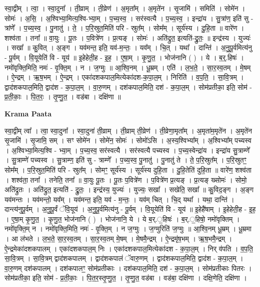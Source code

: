 \documentclass[17pt]{extarticle}
\begin{document}
स्वा॒द्वीम् । त्वा॒ । स्वा॒दुना᳚ । ती॒व्राम् । ती॒व्रेण॑ । अ॒मृता᳚म् । अ॒मृते॑न । सृ॒जामि॑ । समिति॑ । सोमे॑न । सोमः॑ । अ॒सि॒ । अ॒श्विभ्या॒मित्य॒श्वि-भ्या॒म् । प॒च्य॒स्व॒ । सर॑स्वत्यै । प॒च्य॒स्व॒ । इन्द्रा॑य । सु॒त्रांण॒ इति॑ सु - त्रांणे᳚ । प॒च्य॒स्व॒ । पु॒नातु॑ । ते॒ । प॒रि॒स्रुत॒मिति॑ परि - स्रुत᳚म् । सोम᳚म् । सूर्य॑स्य । दु॒हि॒ता ॥ वारे॑ण । शश्व॑ता । तना᳚ ॥ वा॒युः । पू॒तः । प॒वित्रे॑ण । प्र॒त्यङ् । सोमः॑ । अति॑द्रुत॒ इत्यति॑-द्रु॒तः॒ ॥ इन्द्र॑स्य । युज्यः॑ । सखा᳚ ॥ कु॒वित् । अ॒ङ्ग । यव॑मन्त॒ इति॒ यव॑-म॒न्तः॒ । यव᳚म् । चि॒त् । यथा᳚ । दान्ति॑ । अ॒नु॒पू॒र्वमित्य॑नु - पू॒र्वम् । वि॒यूयेति॑ वि - यूय॑ ॥ इ॒हेहेती॒ह - इ॒ह॒ । ए॒षा॒म् । कृ॒णु॒त॒ । भोज॑नानि ( ) । ये । ब॒र्॒.हिषः॑ । नमो॑वृक्ति॒मिति॒ नमः॑ - वृ॒क्ति॒म् । न । ज॒ग्मुः ॥ आ॒श्वि॒नम् । धू॒म्रम् । एति॑ । ल॒भ॒ते॒ । सा॒र॒स्व॒तम् । मे॒षम् । ऐ॒न्द्रम् । ऋ॒ष॒भम् । ऐ॒न्द्रम् । एका॑दशकपाल॒मित्येका॑दश-क॒पा॒ल॒म् । निरिति॑ । व॒प॒ति॒ । सा॒वि॒त्रम् । द्वाद॑शकपाल॒मिति॒ द्वाद॑श - क॒पा॒ल॒म् । वा॒रु॒णम् । दश॑कपाल॒मिति॒ दश॑ - क॒पा॒ल॒म् । सोम॑प्रतीका॒ इति॒ सोम॑ - प्र॒ती॒काः॒ । पि॒त॒रः॒ । तृ॒प्णु॒त॒ । वड॑बा । दक्षि॑णा ॥  \newline


\textbf{Krama Paata} \newline

स्वा॒द्वीम् त्वा᳚ । त्वा॒ स्वा॒दुना᳚ । स्वा॒दुना॑ ती॒व्राम् । ती॒व्राम् ती॒व्रेण॑ । ती॒व्रेणा॒मृता᳚म् । अ॒मृता॑म॒मृते॑न । अ॒मृते॑न सृ॒जामि॑ । सृ॒जामि॒ सम् । सꣳ सोमे॑न । सोमे॑न॒ सोमः॑ । सोमो॑ऽसि । अ॒स्य॒श्विभ्या᳚म् । अ॒श्विभ्या᳚म् पच्यस्व । अ॒श्विभ्या॒मित्य॒श्वि - भ्या॒म् । प॒च्य॒स्व॒ सर॑स्वत्यै । सर॑स्वत्यै पच्यस्व । प॒च्य॒स्वेन्द्रा॑य । इन्द्रा॑य सु॒त्राम्णे᳚ । सु॒त्राम्णे॑ पच्यस्व । सु॒त्राम्ण॒ इति॑ सु - त्राम्णे᳚ । प॒च्य॒स्व॒ पु॒नातु॑ । पु॒नातु॑ ते । ते॒ प॒रि॒स्रुत᳚म् । प॒रि॒स्रुतꣳ॒॒ सोम᳚म् । प॒रि॒स्रुत॒मिति॑ परि - स्रुत᳚म् । सोमꣳ॒॒ सूर्य॑स्य । सूर्य॑स्य दुहि॒ता । दु॒हि॒तेति॑ दुहि॒ता ॥ वारे॑ण॒ शश्व॑ता । शश्व॑ता॒ तना᳚ । तनेति॒ तना᳚ ॥ वा॒युः पू॒तः । पू॒तः प॒वित्रे॑ण । प॒वित्रे॑ण प्र॒त्यङ् । प्र॒त्यङ् ख्सोमः॑ । सोमो॒ अति॑द्रुतः । अति॑द्रुत॒ इत्यति॑ - द्रु॒तः॒ । इन्द्र॑स्य॒ युज्यः॑ । युज्यः॒ सखा᳚ । सखेति॒ सखा᳚ ॥ कु॒विद॒ङ्ग । अ॒ङ्ग यव॑मन्तः । यव॑मन्तो॒ यव᳚म् । यव॑मन्त॒ इति॒ यव॑ - म॒न्तः॒ । यव॑म् चित् । चि॒द् यथा᳚ । यथा॒ दान्ति॑ । दान्त्य॑नुपू॒र्वम् । अ॒नु॒पू॒र्वं ॅवि॒यूय॑ । अ॒नु॒पू॒र्वमित्य॑नु - पू॒र्वम् । वि॒यूयेति॑ वि - यूय॑ ॥ इ॒हेहै॑षाम् । इ॒हेहेती॒ह - इ॒ह॒ । ए॒षा॒म् कृ॒णु॒त॒ । कृ॒णु॒त॒ भोज॑नानि ( ) । भोज॑नानि॒ ये । ये ब॒र्.॒हिषः॑ । ब॒र्.॒हिषो॒ नमो॑वृक्तिम् । नमो॑वृक्ति॒म् न । नमो॑वृक्ति॒मिति॒ नमः॑ - वृ॒क्ति॒म् । न ज॒ग्मुः । ज॒ग्मुरिति॑ ज॒ग्मुः ॥ आ॒श्वि॒नम् धू॒म्रम् । धू॒म्रमा । आ ल॑भते । ल॒भ॒ते॒ सा॒र॒स्व॒तम् । सा॒र॒स्व॒तम् मे॒षम् । मे॒षमै॒न्द्रम् । ऐ॒न्द्रमृ॑ष॒भम् । ऋ॒ष॒भमै॒न्द्रम् । ऐ॒न्द्रमेका॑दशकपालम् । एका॑दशकपाल॒म् निः । एका॑दशकपाल॒मित्येका॑दश - क॒पा॒ल॒म् । निर् व॑पति । व॒प॒ति॒ सा॒वि॒त्रम् । सा॒वि॒त्रम् द्वाद॑शकपालम् । द्वाद॑शकपालं ॅवारु॒णम् । द्वाद॑शकपाल॒मिति॒ द्वाद॑श - क॒पा॒ल॒म् । वा॒रु॒णम् दश॑कपालम् । दश॑कपालꣳ॒॒ सोम॑प्रतीकाः । दश॑कपाल॒मिति॒ दश॑ - क॒पा॒ल॒म् । सोम॑प्रतीकाः पितरः । सोम॑प्रतीका॒ इति॒ सोम॑ - प्र॒ती॒काः॒ । पि॒त॒र॒स्तृ॒प्णु॒त॒ । तृ॒प्णु॒त॒ वड॑बा । वड॑बा॒ दक्षि॑णा । दक्षि॒णेति॒ दक्षि॑णा । \newline
\end{document}
